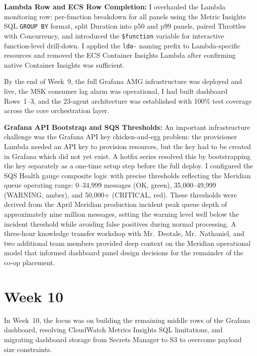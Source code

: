 \textbf{Lambda Row and ECS Row Completion:} 
I overhauled the Lambda monitoring row: per-function breakdown for all
panels using the Metric Insights SQL \texttt{GROUP BY} format, split
Duration into p50 and p99 panels, paired Throttles with Concurrency,
and introduced the \texttt{\$function} variable for interactive
function-level drill-down. I applied the \texttt{lda-} naming prefix
to Lambda-specific resources and removed the ECS Container Insights Lambda
after confirming native Container Insights was
sufficient.

By the end of Week~9, the full Grafana AMG infrastructure was
deployed and live, the MSK consumer lag alarm was operational,
I had built dashboard Rows~1--3, and the 23-agent architecture was
established with 100\% test coverage across the core orchestration
layer.

\textbf{Grafana API Bootstrap and SQS Thresholds:} 
An important
infrastructure challenge was the Grafana API key chicken-and-egg
problem: the provisioner Lambda needed an API key to provision
resources, but the key had to be created in Grafana which did not
yet exist. A hotfix series resolved this by bootstrapping the key
separately as a one-time setup step before the full deploy. I configured the SQS
Health gauge composite logic with precise thresholds
reflecting the Meridian queue operating range: 0--34,999 messages
(OK, green), 35,000--49,999 (WARNING, amber), and 50,000+
(CRITICAL, red). These thresholds were derived from the April
Meridian production incident peak queue depth of approximately nine million
messages, setting the warning level well below the incident
threshold while avoiding false positives during normal processing.
A three-hour knowledge transfer workshop with Mr.\ Deotale, Mr.\ Nathaniel,
and two additional team members provided
deep context on the Meridian operational model that informed
dashboard panel design decisions for the remainder of the co-op placement.


\FloatBarrier

\section{Week 10}
\label{sec:week10}

In Week~10, the focus was on building the remaining middle rows
of the Grafana dashboard, resolving CloudWatch Metrics Insights
SQL limitations, and migrating dashboard storage from Secrets
Manager to S3 to overcome payload size constraints.

